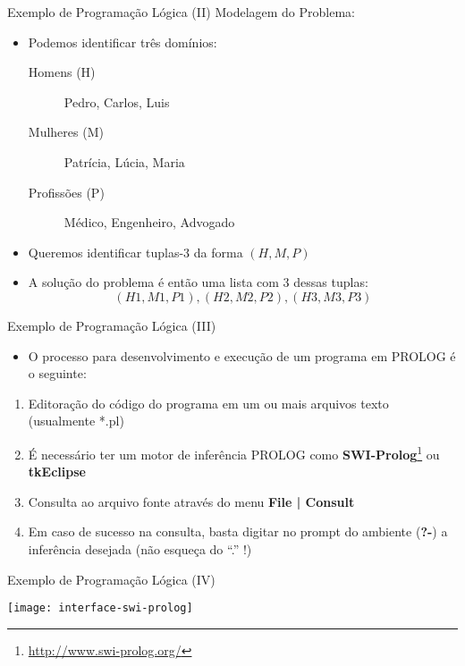 \begin{frame}[t]{Exemplo de Programação Lógica (II)}
	Modelagem do Problema:
	
	\begin{itemize}
	\item Podemos identificar três domínios:
	\begin{description}
	\item[Homens (H)] Pedro, Carlos, Luis
	\item[Mulheres (M)] Patrícia, Lúcia, Maria
	\item[Profissões (P)] Médico, Engenheiro, Advogado
	\end{description}
	
	\item Queremos identificar tuplas-3 da forma $(H,M,P)$
	
	\item A solução do problema é então uma lista com 3 dessas tuplas: $$(H1, M1, P1), (H2, M2, P2), (H3, M3, P3)$$
	\end{itemize}
\end{frame}

\begin{frame}[t]{Exemplo de Programação Lógica (III)}
	\begin{itemize}
	\item O processo para desenvolvimento e execução de um programa em PROLOG é o seguinte:
	\end{itemize}
	\begin{enumerate}
	\item Editoração do código do programa em um ou mais arquivos texto (usualmente *.pl)
	\item É necessário ter um motor de inferência PROLOG como {\bf SWI-Prolog}\footnote{\url{http://www.swi-prolog.org/}} ou {\bf tkEclipse}
	\item Consulta ao arquivo fonte através do menu {\bf File | Consult}
	\item Em caso de sucesso na consulta, basta digitar no prompt do ambiente ({\bf ?-}) a inferência desejada (não esqueça do ``.'' !)
	\end{enumerate}
\end{frame}

\begin{frame}[t]{Exemplo de Programação Lógica (IV)}
	\begin{center}
	\texttt{[image: interface-swi-prolog]}
	\end{center}
\end{frame}

